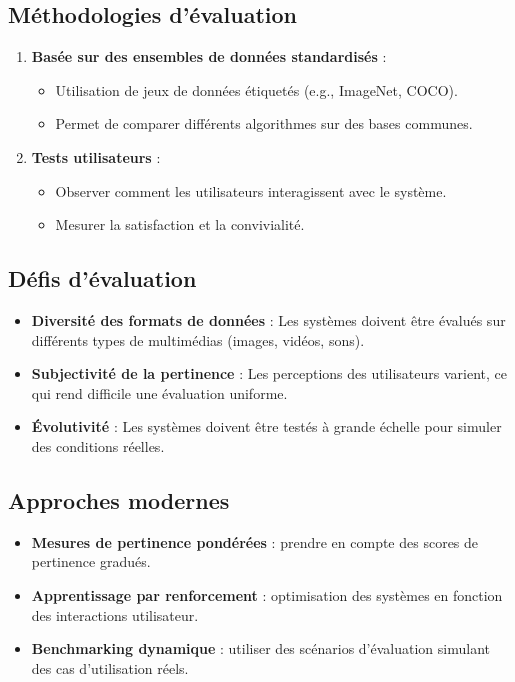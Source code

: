 \begin{section}
\subsection{Méthodologies d’évaluation}
\begin{enumerate}
    \item \textbf{Basée sur des ensembles de données standardisés} :
    \begin{itemize}
        \item Utilisation de jeux de données étiquetés (e.g., ImageNet, COCO).
        \item Permet de comparer différents algorithmes sur des bases communes.
    \end{itemize}
    \item \textbf{Tests utilisateurs} :
    \begin{itemize}
        \item Observer comment les utilisateurs interagissent avec le système.
        \item Mesurer la satisfaction et la convivialité.
    \end{itemize}
\end{enumerate}

\subsection{Défis d’évaluation}
\begin{itemize}
    \item \textbf{Diversité des formats de données} : Les systèmes doivent être évalués sur différents types de multimédias (images, vidéos, sons).
    \item \textbf{Subjectivité de la pertinence} : Les perceptions des utilisateurs varient, ce qui rend difficile une évaluation uniforme.
    \item \textbf{Évolutivité} : Les systèmes doivent être testés à grande échelle pour simuler des conditions réelles.
\end{itemize}

\subsection{Approches modernes}
\begin{itemize}
    \item \textbf{Mesures de pertinence pondérées} : prendre en compte des scores de pertinence gradués.
    \item \textbf{Apprentissage par renforcement} : optimisation des systèmes en fonction des interactions utilisateur.
    \item \textbf{Benchmarking dynamique} : utiliser des scénarios d’évaluation simulant des cas d’utilisation réels.
\end{itemize}

\end{section}